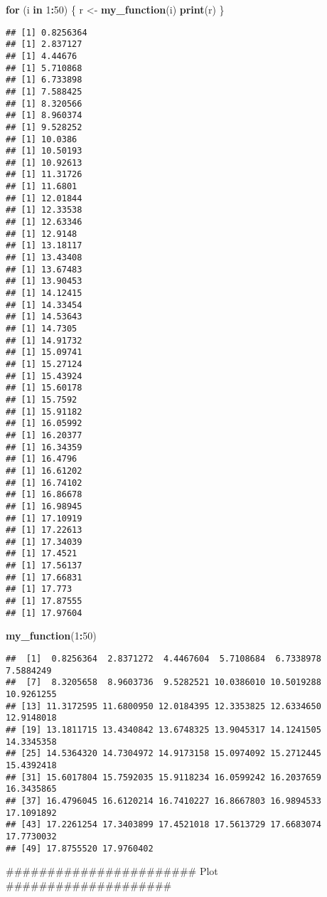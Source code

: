 \documentclass[]{article}
\newenvironment{Shaded}{\begin{snugshade}}{\end{snugshade}}
\newcommand{\KeywordTok}[1]{\textcolor[rgb]{0.13,0.29,0.53}{\textbf{#1}}}
\newcommand{\DecValTok}[1]{\textcolor[rgb]{0.00,0.00,0.81}{#1}}
\newcommand{\StringTok}[1]{\textcolor[rgb]{0.31,0.60,0.02}{#1}}
\newcommand{\ControlFlowTok}[1]{\textcolor[rgb]{0.13,0.29,0.53}{\textbf{#1}}}
\newcommand{\OperatorTok}[1]{\textcolor[rgb]{0.81,0.36,0.00}{\textbf{#1}}}
\newcommand{\NormalTok}[1]{#1}
\begin{document}
\begin{Shaded}
\begin{Highlighting}[]
\ControlFlowTok{for}\NormalTok{ (i }\ControlFlowTok{in} \DecValTok{1}\OperatorTok{:}\DecValTok{50}\NormalTok{) \{}
\NormalTok{    r <-}\StringTok{ }\KeywordTok{my_function}\NormalTok{(i)}
    \KeywordTok{print}\NormalTok{(r) }
\NormalTok{\}}
\end{Highlighting}
\end{Shaded}

\begin{verbatim}
## [1] 0.8256364
## [1] 2.837127
## [1] 4.44676
## [1] 5.710868
## [1] 6.733898
## [1] 7.588425
## [1] 8.320566
## [1] 8.960374
## [1] 9.528252
## [1] 10.0386
## [1] 10.50193
## [1] 10.92613
## [1] 11.31726
## [1] 11.6801
## [1] 12.01844
## [1] 12.33538
## [1] 12.63346
## [1] 12.9148
## [1] 13.18117
## [1] 13.43408
## [1] 13.67483
## [1] 13.90453
## [1] 14.12415
## [1] 14.33454
## [1] 14.53643
## [1] 14.7305
## [1] 14.91732
## [1] 15.09741
## [1] 15.27124
## [1] 15.43924
## [1] 15.60178
## [1] 15.7592
## [1] 15.91182
## [1] 16.05992
## [1] 16.20377
## [1] 16.34359
## [1] 16.4796
## [1] 16.61202
## [1] 16.74102
## [1] 16.86678
## [1] 16.98945
## [1] 17.10919
## [1] 17.22613
## [1] 17.34039
## [1] 17.4521
## [1] 17.56137
## [1] 17.66831
## [1] 17.773
## [1] 17.87555
## [1] 17.97604
\end{verbatim}

\begin{Shaded}
\begin{Highlighting}[]
\KeywordTok{my_function}\NormalTok{(}\DecValTok{1}\OperatorTok{:}\DecValTok{50}\NormalTok{)}
\end{Highlighting}
\end{Shaded}

\begin{verbatim}
##  [1]  0.8256364  2.8371272  4.4467604  5.7108684  6.7338978  7.5884249
##  [7]  8.3205658  8.9603736  9.5282521 10.0386010 10.5019288 10.9261255
## [13] 11.3172595 11.6800950 12.0184395 12.3353825 12.6334650 12.9148018
## [19] 13.1811715 13.4340842 13.6748325 13.9045317 14.1241505 14.3345358
## [25] 14.5364320 14.7304972 14.9173158 15.0974092 15.2712445 15.4392418
## [31] 15.6017804 15.7592035 15.9118234 16.0599242 16.2037659 16.3435865
## [37] 16.4796045 16.6120214 16.7410227 16.8667803 16.9894533 17.1091892
## [43] 17.2261254 17.3403899 17.4521018 17.5613729 17.6683074 17.7730032
## [49] 17.8755520 17.9760402
\end{verbatim}

 \#\#\#\#\#\#\#\#\#\#\#\#\#\#\#\#\#\#\#\#\#\#\# Plot
\#\#\#\#\#\#\#\#\#\#\#\#\#\#\#\#\#\#\#\#
\end{document}
